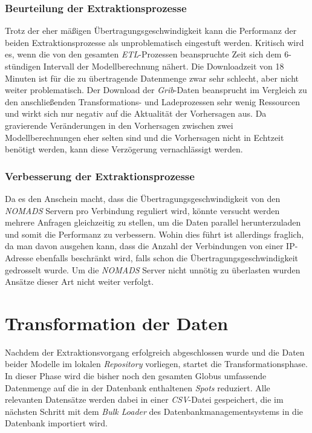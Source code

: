 \subsubsection{Beurteilung der Extraktionsprozesse}
Trotz der eher mäßigen Übertragungsgeschwindigkeit kann die Performanz
der beiden Extraktionsprozesse als unproblematisch eingestuft
werden. Kritisch wird es, wenn die von den gesamten
\textit{ETL}-Prozessen beanspruchte Zeit sich dem 6-stündigen
Intervall der Modellberechnung nähert. Die Downloadzeit von 18 Minuten
ist für die zu übertragende Datenmenge zwar sehr schlecht, aber nicht
weiter problematisch. Der Download der \textit{Grib}-Daten beansprucht
im Vergleich zu den anschließenden Transformations- und Ladeprozessen
sehr wenig Ressourcen und wirkt sich nur negativ auf die Aktualität
der Vorhersagen aus. Da gravierende Veränderungen in den Vorhersagen
zwischen zwei Modellberechnungen eher selten sind und die Vorhersagen
nicht in Echtzeit benötigt werden, kann diese Verzögerung
vernachlässigt werden.

\subsubsection{Verbesserung der Extraktionsprozesse}
Da es den Anschein macht, dass die Übertragungsgeschwindigkeit von den
\textit{NOMADS} Servern pro Verbindung reguliert wird, könnte versucht
werden mehrere Anfragen gleichzeitig zu stellen, um die Daten parallel
herunterzuladen und somit die Performanz zu verbessern. Wohin dies
führt ist allerdings fraglich, da man davon ausgehen kann, dass die
Anzahl der Verbindungen von einer IP-Adresse ebenfalls beschränkt
wird, falls schon die Übertragungsgeschwindigkeit gedrosselt wurde. Um
die \textit{NOMADS} Server nicht unnötig zu überlasten wurden Ansätze
dieser Art nicht weiter verfolgt.

\section{Transformation der Daten}
Nachdem der Extraktionsvorgang erfolgreich abgeschlossen wurde und die
Daten beider Modelle im lokalen \textit{Repository} vorliegen, startet
die Transformationsphase. In dieser Phase wird die bisher noch den
gesamten Globus umfassende Datenmenge auf die in der Datenbank
enthaltenen \textit{Spots} reduziert. Alle relevanten Datensätze
werden dabei in einer \textit{CSV}-Datei
 gespeichert, die im
nächsten Schritt mit dem \textit{Bulk Loader} des
Datenbankmanagementsystems in die Datenbank importiert wird.


